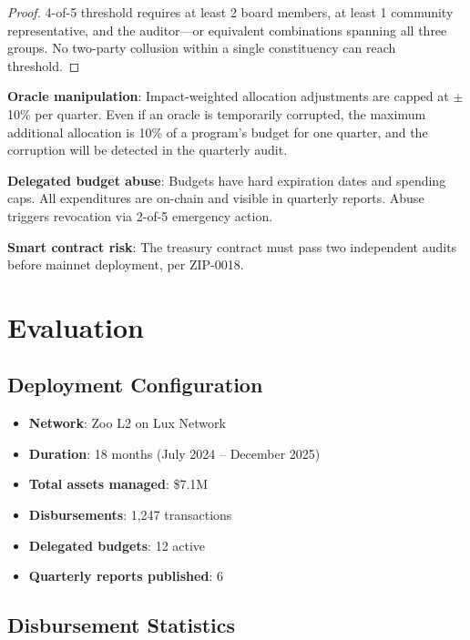 \documentclass[11pt,letterpaper]{article}
\begin{document}
\begin{proof}
4-of-5 threshold requires at least 2 board members, at least 1 community representative, and the auditor---or equivalent combinations spanning all three groups. No two-party collusion within a single constituency can reach threshold.
\end{proof}

\textbf{Oracle manipulation}: Impact-weighted allocation adjustments are capped at $\pm$10\% per quarter. Even if an oracle is temporarily corrupted, the maximum additional allocation is 10\% of a program's budget for one quarter, and the corruption will be detected in the quarterly audit.

\textbf{Delegated budget abuse}: Budgets have hard expiration dates and spending caps. All expenditures are on-chain and visible in quarterly reports. Abuse triggers revocation via 2-of-5 emergency action.

\textbf{Smart contract risk}: The treasury contract must pass two independent audits before mainnet deployment, per ZIP-0018.

\section{Evaluation}

\subsection{Deployment Configuration}

\begin{itemize}
    \item \textbf{Network}: Zoo L2 on Lux Network
    \item \textbf{Duration}: 18 months (July 2024 -- December 2025)
    \item \textbf{Total assets managed}: \$7.1M
    \item \textbf{Disbursements}: 1{,}247 transactions
    \item \textbf{Delegated budgets}: 12 active
    \item \textbf{Quarterly reports published}: 6
\end{itemize}

\subsection{Disbursement Statistics}
\end{document}

